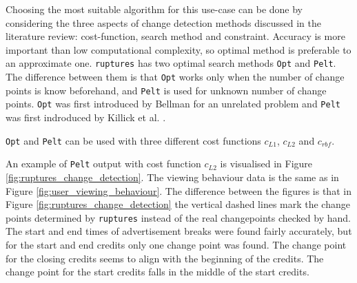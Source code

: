 Choosing the most suitable algorithm %
for this use-case can be done by considering the three aspects of change detection methods discussed in the literature review: cost-function, search method and constraint. Accuracy is more important than low computational complexity, so optimal method is preferable to an approximate one. \texttt{ruptures} has two optimal search methods \texttt{Opt} and \texttt{Pelt}. The difference between them is that \texttt{Opt} works only when the number of change points is know beforehand, and \texttt{Pelt} is used for unknown number of change points. %
\texttt{Opt} was first introduced by Bellman \cite{bellmanRoutingProblem1958} for an unrelated problem and \texttt{Pelt} was first indroduced by Killick et al. \cite{killickOptimalDetectionChangepoints2012}. 

\texttt{Opt} and \texttt{Pelt} can be used with three different cost functions $c_{L1}$, $c_{L2}$ and $c_{rbf}$. 


An example of \texttt{Pelt} output with cost function $c_{L2}$ is visualised in Figure \ref{fig:ruptures_change_detection}. The viewing behaviour data is the same as in Figure \ref{fig:user_viewing_behaviour}. The difference between the figures is that in Figure \ref{fig:ruptures_change_detection} the vertical dashed lines mark the change points determined by \texttt{ruptures} instead of the real changepoints checked by hand. The start and end times of advertisement breaks were found fairly accurately, but for the start and end credits only one change point was found. The change point for the closing credits seems to align with the beginning of the credits. The change point for the start credits falls in the middle of the start credits.



